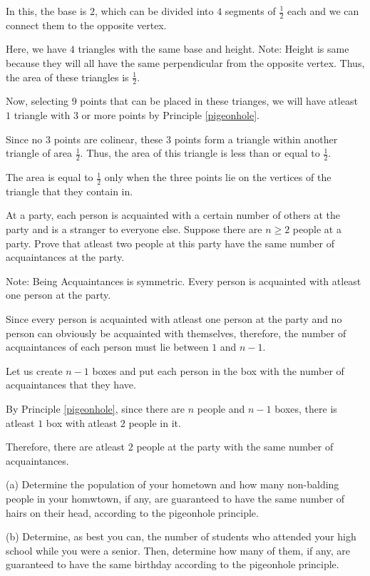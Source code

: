 	In this, the base is $2$, which can be divided into $4$ segments of $\frac{1}{2}$ each and we can connect them to the opposite vertex.

	Here, we have $4$ triangles with the same base and height. Note: Height is same because they will all have the same perpendicular from the opposite vertex.
	Thus, the area of these triangles is $\frac{1}{2}$.

	Now, selecting $9$ points that can be placed in these trianges, we will have atleast $1$ triangle with $3$ or more points by Principle \ref{pigeonhole}. 

	Since no $3$ points are colinear, these $3$ points form a triangle within another triangle of area $\frac{1}{2}$. Thus, the area of this triangle is less than or equal to $\frac{1}{2}$.

	The area is equal to $\frac{1}{2}$ only when the three points lie on the vertices of the triangle that they contain in.

\es


\bp 
	At a party, each person is acquainted with a certain number of others at the party and is a stranger to everyone else. Suppose there are $n \geq 2$ people at a party. Prove that atleast two people at this party have the same number of acquaintances at the party.

	Note: Being Acquaintances is symmetric. Every person is acquainted with atleast one person at the party.
\ep 

\bs
Since every person is acquainted with atleast one person at the party and no person can obviously be acquainted with themselves, therefore, the number of acquaintances of each person must lie between $1$ and $n-1$.

Let us create $n-1$ boxes and put each person in the box with the number of acquaintances that they have.

By Principle \ref{pigeonhole}, since there are $n$ people and $n-1$ boxes, there is atleast $1$ box with atleast $2$ people in it.

Therefore, there are atleast $2$ people at the party with the same number of acquaintances.
\es

\bp 
	(a) Determine the population of your hometown and how many non-balding people in your homwtown, if any, are guaranteed to have the same number of hairs on their head, according to the pigeonhole principle.

	(b) Determine, as best you can, the number of students who attended your high school while you were a senior. Then, determine how many of them, if any, are guaranteed to have the same birthday according to the pigeonhole principle.
\ep 

